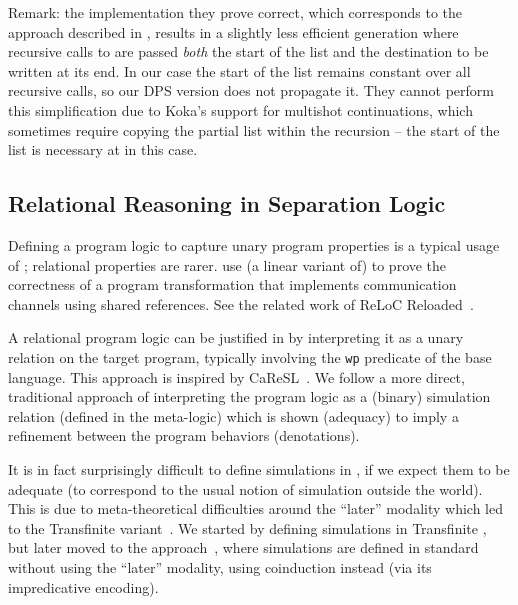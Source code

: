 Remark: the implementation they prove correct, which corresponds to the approach described in \citet*{minamide-98}, results in a slightly less efficient generation where recursive calls to  are passed \emph{both} the start of the list and the destination to be written at its end. In our case the start of the list remains constant over all recursive calls, so our DPS version does not propagate it. They cannot perform this simplification due to Koka's support for multishot continuations, which sometimes require copying the partial list within the recursion -- the start of the list is necessary at in this case.

\subsection{Relational Reasoning in Separation Logic}

Defining a program logic to capture unary program properties is a typical usage of \Iris; relational properties are rarer. \citet*{tassarotti-2017} use (a linear variant of) \Iris to prove the correctness of a program transformation that implements communication channels using shared references. See the related work of ReLoC Reloaded~\citep*{reloc-2021}.

A relational program logic can be justified in \Iris by interpreting it as a unary relation on the target program, typically involving the \texttt{wp} predicate of the base language. This approach is inspired by CaReSL~\citep*{caresl-2013}. We follow a more direct, traditional approach of interpreting the program logic as a (binary) simulation relation (defined in the \Iris meta-logic) which is shown (adequacy) to imply a refinement between the program behaviors (denotations).

It is in fact surprisingly difficult to define simulations in \Iris, if we expect them to be adequate (to correspond to the usual notion of simulation outside the \Iris world). This is due to meta-theoretical difficulties around the ``later'' modality which led to the Transfinite \Iris variant~\citep*{transfinite-iris-2021}. We started by defining simulations in Transfinite \Iris, but later moved to the \Simuliris approach~\citep*{simuliris-2022}, where simulations are defined in standard \Iris without using the ``later'' modality, using coinduction instead (via its impredicative encoding).

